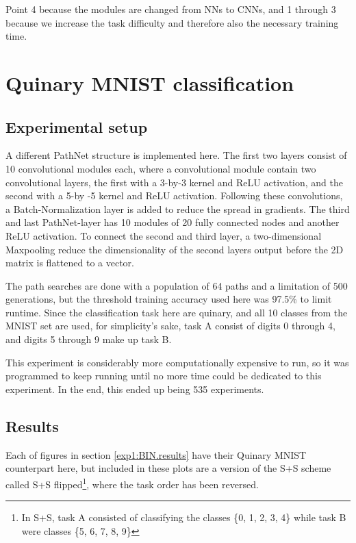 Point 4 because the modules are changed from NNs to CNNs, and 1 through 3 because we increase the task difficulty and therefore also the necessary training time. 

\section{Quinary MNIST classification}
\subsection{Experimental setup}
A different PathNet structure is implemented here. The first two layers consist of 10 convolutional modules each, where a convolutional module contain two convolutional layers, the first with a 3-by-3 kernel and ReLU activation, and the second with a 5-by -5 kernel and ReLU activation. Following these convolutions, a Batch-Normalization layer is added to reduce the spread in gradients. The third and last PathNet-layer has 10 modules of 20 fully connected nodes and another ReLU activation. To connect the second and third layer, a two-dimensional Maxpooling reduce the dimensionality of the second layers output before the 2D matrix is flattened to a vector.   

The path searches are done with a population of 64 paths and a limitation of 500 generations, but the threshold training accuracy used here was 97.5\% to limit runtime. 
Since the classification task here are quinary, and all 10 classes from the MNIST set are used, for simplicity's sake, task A consist of digits 0 through 4, and digits 5 through 9 make up task B. 

This experiment is considerably more computationally expensive to run, so it was programmed to keep running until no more time could be dedicated to this experiment. In the end, this ended up being 535 experiments. 

\subsection{Results}
\label{exp1:results.quinary}
Each of figures in section \ref{exp1:BIN.results} have their Quinary MNIST counterpart here, but included in these plots are a version of the S+S scheme called S+S flipped\footnote{In S+S, task A consisted of classifying the classes \{0, 1, 2, 3, 4\} while task B were classes \{5, 6, 7, 8, 9\}}, where the task order has been reversed.

